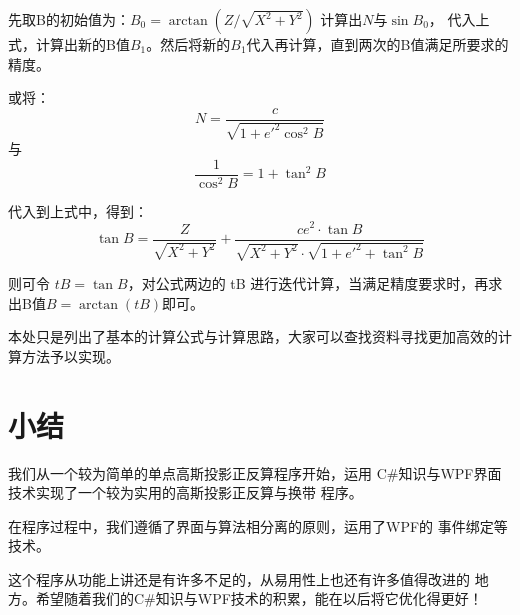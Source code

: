 先取B的初始值为：$B_0 =\arctan{ (Z / \sqrt{X^2 + Y^2} ) }$ 计算出$N$与$\sin B_0$，
代入上式，计算出新的B值$B_1$。然后将新的$B_1$代入再计算，直到两次的B值满足所要求的
精度。

或将：
$$N = \frac{c}{\sqrt{1+e'^2 \cos ^2 B}}$$
与$$\frac{1}{\cos^2 B} = 1+ \tan^2 B$$

代入到上式中，得到：
\begin{equation}
    \tan B = \frac{Z}{\sqrt{X^2 + Y^2}} + \frac{ce^2 \cdot \tan B}{\sqrt{X^2 + Y^2} \cdot \sqrt{1 + e'^2 + \tan^2 B}}
\end{equation}

则可令 $tB = \tan B$，对公式两边的 tB 进行迭代计算，当满足精度要求时，再求出B值$B=\arctan (tB)$即可。

本处只是列出了基本的计算公式与计算思路，大家可以查找资料寻找更加高效的计算方法予以实现。

\section*{小结}

我们从一个较为简单的单点高斯投影正反算程序开始，运用
C\#知识与WPF界面技术实现了一个较为实用的高斯投影正反算与换带
程序。

在程序过程中，我们遵循了界面与算法相分离的原则，运用了WPF的
事件绑定等技术。

这个程序从功能上讲还是有许多不足的，从易用性上也还有许多值得改进的
地方。希望随着我们的C\#知识与WPF技术的积累，能在以后将它优化得更好！
